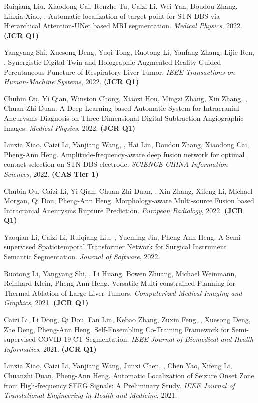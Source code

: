 \documentclass[a4paper,12pt,english]{curve}
\begin{document}
\begin{small}
\begin{publist}
\item Ruiqiang Liu, Xiaodong Cai, Renzhe Tu, Caizi Li, Wei Yan, Doudou Zhang, Linxia Xiao, \WS\CORR. Automatic localization of target point for STN-DBS via Hierarchical Attention-UNet based MRI segmentation. \emph{Medical Physics}, 2022. \textbf{(JCR Q1)}
\item Yangyang Shi, Xuesong Deng, Yuqi Tong, Ruotong Li, Yanfang Zhang, Lijie Ren, \WS\CORR. Synergistic Digital Twin and Holographic Augmented Reality Guided Percutaneous Puncture of Respiratory Liver Tumor. \emph{IEEE Transactions on Human-Machine Systems}, 2022. \textbf{(JCR Q1)}
\item Chubin Ou, Yi Qian, Winston Chong, Xiaoxi Hou, Mingzi Zhang, Xin Zhang, \WS\CORR, Chuan-Zhi Duan\CORR. A Deep Learning based Automatic System for Intracranial Aneurysms Diagnosis on Three-Dimensional Digital Subtraction Angiographic Images. \emph{Medical Physics}, 2022. \textbf{(JCR Q1)}
\item Linxia Xiao, Caizi Li, Yanjiang Wang, \WS\CORR, Hai Lin, Doudou Zhang, Xiaodong Cai, Pheng-Ann Heng. Amplitude-frequency-aware deep fusion network for optimal contact selection on STN-DBS electrode. \emph{SCIENCE CHINA Information Sciences}, 2022. \textbf{(CAS Tier 1)}
\item Chubin Ou, Caizi Li, Yi Qian\CORR, Chuan-Zhi Duan\CORR, \WS\CORR, Xin Zhang, Xifeng Li, Michael Morgan, Qi Dou, Pheng-Ann Heng. Morphology-aware Multi-source Fusion based Intracranial Aneurysms Rupture Prediction. \emph{European Radiology}, 2022. \textbf{(JCR Q1)}
\item Yaoqian Li, Caizi Li, Ruiqiang Liu, \WS\CORR, Yueming Jin, Pheng-Ann Heng. A Semi-supervised Spatiotemporal Transformer Network for Surgical Instrument Semantic Segmentation. \emph{Journal of Software}, 2022.
\item Ruotong Li, Yangyang Shi, \WS\CORR, Li Huang, Bowen Zhuang, Michael Weinmann, Reinhard Klein, Pheng-Ann Heng. Versatile Multi-constrained Planning for Thermal Ablation of Large Liver Tumors. \emph{Computerized Medical Imaging and Graphics}, 2021. \textbf{(JCR Q1)}
\item Caizi Li, Li Dong, Qi Dou, Fan Lin, Kebao Zhang, Zuxin Feng, \WS\CORR, Xuesong Deng, Zhe Deng, Pheng-Ann Heng. Self-Ensembling Co-Training Framework for Semi-supervised COVID-19 CT Segmentation. \emph{IEEE Journal of Biomedical and Health Informatics}, 2021. \textbf{(JCR Q1)}
\item Linxia Xiao, Caizi Li, Yanjiang Wang, Junxi Chen, \WS\CORR, Chen Yao, Xifeng Li, Chuanzhi Duan, Pheng-Ann Heng. Automatic Localization of Seizure Onset Zone from High-frequency SEEG Signals: A Preliminary Study. \emph{IEEE Journal of Translational Engineering in Health and Medicine}, 2021.

\end{publist}
\end{small}
\end{document}
